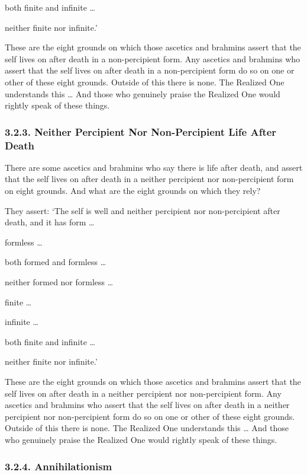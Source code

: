 \documentclass[12pt,openany]{book}%
\begin{document}
both finite and infinite … 

neither finite nor infinite.’ 

These are the eight grounds on which those ascetics and brahmins assert that the self lives on after death in a non-percipient form. Any ascetics and brahmins who assert that the self lives on after death in a non-percipient form do so on one or other of these eight grounds. Outside of this there is none. The Realized One understands this … And those who genuinely praise the Realized One would rightly speak of these things. 

\subsubsection*{3.2.3. Neither Percipient Nor Non-Percipient Life After Death }

There are some ascetics and brahmins who say there is life after death, and assert that the self lives on after death in a neither percipient nor non-percipient form on eight grounds. And what are the eight grounds on which they rely? 

They assert: ‘The self is well and neither percipient nor non-percipient after death, and it has form … 

formless … 

both formed and formless … 

neither formed nor formless … 

finite … 

infinite … 

both finite and infinite … 

neither finite nor infinite.’ 

These are the eight grounds on which those ascetics and brahmins assert that the self lives on after death in a neither percipient nor non-percipient form. Any ascetics and brahmins who assert that the self lives on after death in a neither percipient nor non-percipient form do so on one or other of these eight grounds. Outside of this there is none. The Realized One understands this … And those who genuinely praise the Realized One would rightly speak of these things. 

\subsubsection*{3.2.4. Annihilationism }
\end{document}
